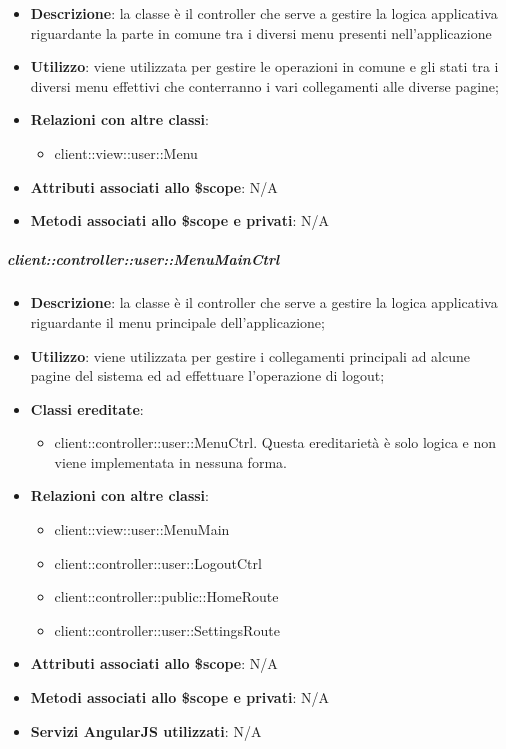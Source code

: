 			\begin{itemize}
				\item \textbf{Descrizione}: la classe è il controller che serve a gestire la logica applicativa riguardante la parte in comune tra i diversi menu presenti nell'applicazione
				\item \textbf{Utilizzo}: viene utilizzata per gestire le operazioni in comune e gli stati tra i diversi menu effettivi che conterranno i vari collegamenti alle diverse pagine;
				\item \textbf{Relazioni con altre classi}:
					\begin{itemize}
						\item client::view::user::Menu
					\end{itemize}
				\item \textbf{Attributi associati allo \$scope}: N/A
				\item \textbf{Metodi associati allo \$scope e privati}: N/A
			\end{itemize}

		\subparagraph{client::controller::user::MenuMainCtrl} %
		\label{subp:client_controller_user_menumainctrl}

			\begin{itemize}
				\item \textbf{Descrizione}: la classe è il controller che serve a gestire la logica applicativa riguardante il menu principale dell'applicazione;
				\item \textbf{Utilizzo}: viene utilizzata per gestire i collegamenti principali ad alcune pagine del sistema ed ad effettuare l'operazione di logout;
				\item \textbf{Classi ereditate}:
					\begin{itemize}
						\item client::controller::user::MenuCtrl. Questa ereditarietà è solo logica e non viene implementata in nessuna forma.
					\end{itemize}
				\item \textbf{Relazioni con altre classi}:
					\begin{itemize}
						\item client::view::user::MenuMain
						\item client::controller::user::LogoutCtrl
						\item client::controller::public::HomeRoute
						\item client::controller::user::SettingsRoute
					\end{itemize}
				\item \textbf{Attributi associati allo \$scope}: N/A
				\item \textbf{Metodi associati allo \$scope e privati}: N/A
				\item \textbf{Servizi AngularJS utilizzati}: N/A
			\end{itemize}

